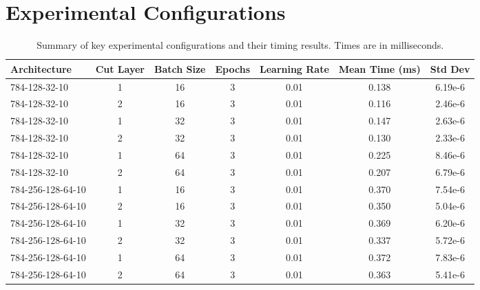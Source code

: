 \documentclass[10pt]{article}
\begin{document}
\section{Experimental Configurations}
\begin{table}[H]
\centering
\small
\begin{tabular}{@{}lcccccc@{}}
\toprule
\textbf{Architecture} & \textbf{Cut Layer} & \textbf{Batch Size} & \textbf{Epochs} & \textbf{Learning Rate} & \textbf{Mean Time (ms)} & \textbf{Std Dev} \\
\midrule
784-128-32-10 & 1 & 16 & 3 & 0.01 & 0.138 & 6.19e-6 \\
784-128-32-10 & 2 & 16 & 3 & 0.01 & 0.116 & 2.46e-6 \\
784-128-32-10 & 1 & 32 & 3 & 0.01 & 0.147 & 2.63e-6 \\
784-128-32-10 & 2 & 32 & 3 & 0.01 & 0.130 & 2.33e-6 \\
784-128-32-10 & 1 & 64 & 3 & 0.01 & 0.225 & 8.46e-6 \\
784-128-32-10 & 2 & 64 & 3 & 0.01 & 0.207 & 6.79e-6 \\
\midrule
784-256-128-64-10 & 1 & 16 & 3 & 0.01 & 0.370 & 7.54e-6 \\
784-256-128-64-10 & 2 & 16 & 3 & 0.01 & 0.350 & 5.04e-6 \\
784-256-128-64-10 & 1 & 32 & 3 & 0.01 & 0.369 & 6.20e-6 \\
784-256-128-64-10 & 2 & 32 & 3 & 0.01 & 0.337 & 5.72e-6 \\
784-256-128-64-10 & 1 & 64 & 3 & 0.01 & 0.372 & 7.83e-6 \\
784-256-128-64-10 & 2 & 64 & 3 & 0.01 & 0.363 & 5.41e-6 \\
\bottomrule
\end{tabular}
\caption{Summary of key experimental configurations and their timing results. Times are in milliseconds.}
\end{table}
\end{document}
